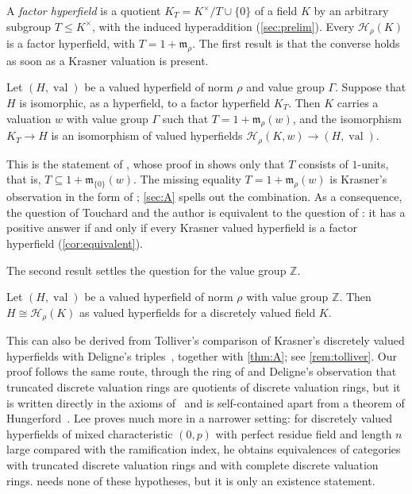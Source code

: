 \documentclass[11pt]{amsart}
\numberwithin{equation}{section}
\newcommand{\val}{\operatorname{val}}
\newcommand{\m}{\mathfrak m}
\newcommand{\Hr}{\mathcal H_\rho}
\newcommand{\Z}{\mathbb Z}
\begin{document}
A \emph{factor hyperfield} is a quotient $K_T=K^\times/T\cup\{0\}$ of a field $K$ by an arbitrary subgroup $T\le K^\times$, with the induced hyperaddition (\cref{sec:prelim}). Every $\Hr(K)$ is a factor hyperfield, with $T=1+\m_\rho$. The first result is that the converse holds as soon as a Krasner valuation is present.

\begin{introthm}\label{thm:A}
Let $(H,\val)$ be a valued hyperfield of norm $\rho$ and value group $\Gamma$. Suppose that $H$ is isomorphic, as a hyperfield, to a factor hyperfield $K_T$. Then $K$ carries a valuation $w$ with value group $\Gamma$ such that $T=1+\m_\rho(w)$, and the isomorphism $K_T\to H$ is an isomorphism of valued hyperfields $\Hr(K,w)\to(H,\val)$.
\end{introthm}

This is the statement of \cite[Proposition~4.11]{Linzi25}, whose proof in \cite{Linzi25} shows only that $T$ consists of $1$-units, that is, $T\subseteq1+\m_{\{0\}}(w)$. The missing equality $T=1+\m_\rho(w)$ is Krasner's observation \cite[p.~148]{Krasner57} in the form of \cite[Lemma~1.25]{LT25}; \cref{sec:A} spells out the combination. As a consequence, the question of Touchard and the author is equivalent to the question of \cite[Remark~4.12]{Linzi25}: it has a positive answer if and only if every Krasner valued hyperfield is a factor hyperfield (\cref{cor:equivalent}).

The second result settles the question for the value group $\Z$.

\begin{introthm}\label{thm:Z}
Let $(H,\val)$ be a valued hyperfield of norm $\rho$ with value group $\Z$. Then $H\cong\Hr(K)$ as valued hyperfields for a discretely valued field $K$.
\end{introthm}

This can also be derived from Tolliver's comparison of Krasner's discretely valued hyperfields with Deligne's triples~\cite{Tolliver16}, together with \cref{thm:A}; see \cref{rem:tolliver}. Our proof follows the same route, through the ring of \cite[Lemmas~4.2 and~4.3]{Tolliver16} and Deligne's observation that truncated discrete valuation rings are quotients of discrete valuation rings, but it is written directly in the axioms of~\cite{LT25} and is self-contained apart from a theorem of Hungerford~\cite{Hungerford68}. Lee \cite[Theorems~4.8 and~4.10]{Lee20} proves much more in a narrower setting: for discretely valued hyperfields of mixed characteristic $(0,p)$ with perfect residue field and length $n$ large compared with the ramification index, he obtains equivalences of categories with truncated discrete valuation rings and with complete discrete valuation rings.  needs none of these hypotheses, but it is only an existence statement.
\end{document}
